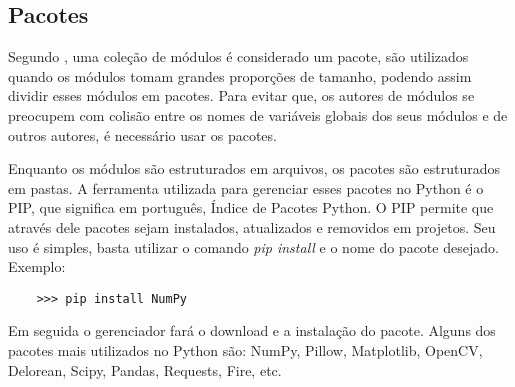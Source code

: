             \subsection{Pacotes}
	Segundo \cite{Borges2014}, uma coleção de módulos é considerado um pacote, são utilizados quando os módulos tomam grandes proporções de tamanho, podendo assim dividir esses módulos em pacotes. Para evitar que, os autores de módulos se preocupem com colisão entre os nomes de variáveis globais dos seus módulos e de outros autores, é necessário usar os pacotes.
	
	Enquanto os módulos são estruturados em arquivos, os pacotes são estruturados em pastas. A ferramenta utilizada para gerenciar esses pacotes no Python é o PIP, que significa em português, Índice de Pacotes Python. O PIP permite que através dele pacotes sejam instalados, atualizados e removidos em projetos. Seu uso é simples, basta utilizar o comando \textit{pip install} e o nome do pacote desejado. Exemplo:
	\begin{lstlisting}
	>>> pip install NumPy
	\end{lstlisting}
	Em seguida o gerenciador fará o download e a instalação do pacote. Alguns dos pacotes mais utilizados no Python são: NumPy, Pillow, Matplotlib, OpenCV, Delorean, Scipy, Pandas, Requests, Fire, etc.





